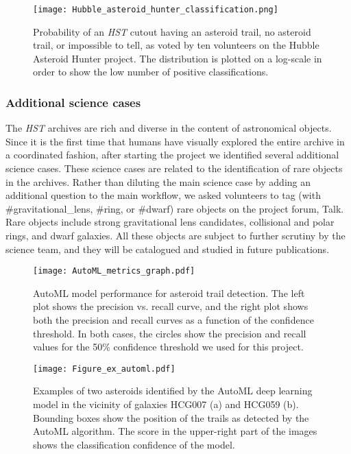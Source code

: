 \documentclass{aa}
\begin{document}
\begin{figure}
   \centering
   \texttt{[image: Hubble\_asteroid\_hunter\_classification.png]}
   \caption{Probability of an \textit{HST} cutout having an asteroid trail, no asteroid trail, or impossible to tell, as voted by ten volunteers on the Hubble Asteroid Hunter project. The distribution is plotted on a log-scale in order to show the low number of positive classifications.}
    \label{classifications}%
\end{figure}

\subsubsection{Additional science cases}

The \textit{HST} archives are rich and diverse in the content of astronomical objects. Since it is the first time that humans have visually explored the entire archive in a coordinated fashion, after starting the project we identified several additional science cases. These science cases are related to the identification of rare objects in the archives. Rather than diluting the main science case by adding an additional question to the main workflow, we asked volunteers to tag (with \#gravitational\_lens, \#ring, or \#dwarf) rare objects on the project forum, Talk. Rare objects include strong gravitational lens candidates, collisional and polar rings, and dwarf galaxies. All these objects are subject to further scrutiny by the science team, and they will be catalogued and studied in future publications. 

\begin{figure}
   \centering
   \texttt{[image: AutoML\_metrics\_graph.pdf]}
   \caption{AutoML model performance for asteroid trail detection. The left plot shows the precision vs. recall curve, and the right plot shows both the precision and recall curves as a function of the confidence threshold. In both cases, the circles show the precision and recall values for the 50\% confidence threshold we used for this project.}
    \label{automl_metrics}%
\end{figure}

\begin{figure*}
   \centering
   \texttt{[image: Figure\_ex\_automl.pdf]}
   \caption{Examples of two asteroids identified by the AutoML deep learning model in the vicinity of galaxies HCG007 (a) and HCG059 (b). Bounding boxes show the position of the trails as detected by the AutoML algorithm. The score in the upper-right part of the images shows the classification confidence of the model.}
    \label{examples_from_automl}%
\end{figure*}
\end{document}

